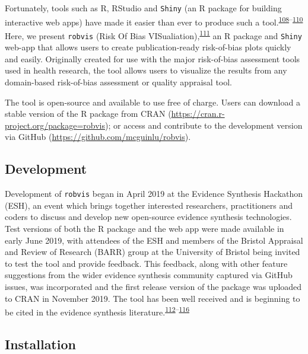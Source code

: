 \documentclass[a4paper, twoside]{templates/ociamthesis}
\begin{document}
Fortunately, tools such as R, RStudio and \texttt{Shiny} (an R package for building interactive web apps) have made it easier than ever to produce such a tool.\textsuperscript{\protect\hyperlink{ref-rref}{108}--\protect\hyperlink{ref-shinyref}{110}} Here, we present \texttt{robvis} (Risk Of Bias VISualiation),\textsuperscript{\protect\hyperlink{ref-mcguinness2019a}{111}} an R package and \texttt{Shiny} web-app that allows users to create publication-ready risk-of-bias plots quickly and easily. Originally created for use with the major risk-of-bias assessment tools used in health research, the tool allows users to visualize the results from any domain-based risk-of-bias assessment or quality appraisal tool.

The tool is open-source and available to use free of charge. Users can download a stable version of the R package from CRAN (\url{https://cran.r-project.org/package=robvis}); or access and contribute to the development version via GitHub (\url{https://github.com/mcguinlu/robvis}).

\hypertarget{development-1}{%
\subsection{Development}\label{development-1}}

Development of \texttt{robvis} began in April 2019 at the Evidence Synthesis Hackathon (ESH), an event which brings together interested researchers, practitioners and coders to discuss and develop new open-source evidence synthesis technologies. Test versions of both the R package and the web app were made available in early June 2019, with attendees of the ESH and members of the Bristol Appraisal and Review of Research (BARR) group at the University of Bristol being invited to test the tool and provide feedback. This feedback, along with other feature suggestions from the wider evidence synthesis community captured via GitHub issues, was incorporated and the first release version of the package was uploaded to CRAN in November 2019. The tool has been well received and is beginning to be cited in the evidence synthesis literature.\textsuperscript{\protect\hyperlink{ref-gibb2019consistent}{112}--\protect\hyperlink{ref-tanneru2020}{116}}

\hypertarget{installation-1}{%
\subsection{Installation}\label{installation-1}}
\end{document}
